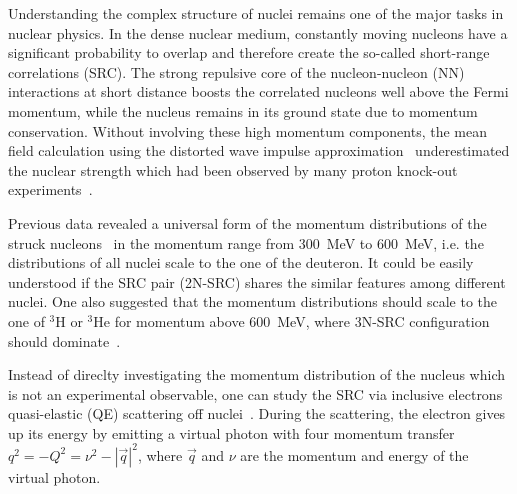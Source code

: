 
Understanding the complex structure of nuclei remains one of the major tasks in nuclear physics. In the dense nuclear medium, constantly moving
nucleons have a significant probability to overlap and therefore create the so-called short-range correlations (SRC). The strong repulsive core
of the nucleon-nucleon (NN) interactions at short distance boosts the correlated nucleons well above the Fermi momentum, while the nucleus remains
in its ground state due to momentum conservation. Without involving these high momentum components, the mean field calculation using the distorted
wave impulse approximation~\cite{DeForest1983} underestimated the nuclear strength which had been observed by many proton knock-out
experiments~\cite{VanDerSteenhoven1988547,Lapikas1993297,Kelly:1996hd}.

Previous data revealed a universal form of the momentum distributions of the struck nucleons~\cite{PhysRevC.53.1689} in the momentum range from
300~MeV to 600~MeV, i.e. the distributions of all nuclei scale to the one of the deuteron. It could be easily understood if the SRC pair (2N-SRC)
shares the similar features among different nuclei. One also suggested that the momentum distributions should scale to the one of $\mathrm{^{3}H}$
or $\mathrm{^{3}He}$ for momentum above 600~MeV, where 3N-SRC configuration should dominate~\cite{src_john}.

Instead of direclty investigating the momentum distribution of the nucleus which is not an experimental observable, one can study the SRC via
inclusive electrons quasi-elastic (QE) scattering off nuclei~\cite{RevModPhys.80.189}. During the scattering, the electron gives up its energy by
emitting a virtual photon with four momentum transfer $q^2 = - Q^{2} = \nu^{2}-|\vec{q}|^{2}$, where $\vec{q}$ and $\nu$ are the momentum and energy
of the virtual photon.




